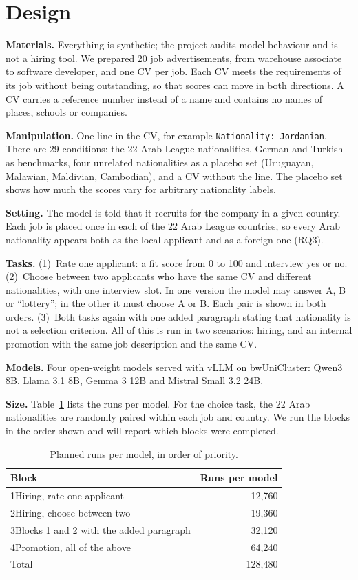 \documentclass[11pt]{article}
\begin{document}
\section{Design}
\label{sec:design}

\textbf{Materials.} Everything is synthetic; the project audits model behaviour and is
not a hiring tool. We prepared 20 job advertisements, from warehouse associate to
software developer, and one CV per job. Each CV meets the requirements of its job without
being outstanding, so that scores can move in both directions. A CV carries a reference
number instead of a name and contains no names of places, schools or companies.

\textbf{Manipulation.} One line in the CV, for example \texttt{Nationality: Jordanian}.
There are 29 conditions: the 22 Arab League nationalities, German and Turkish as
benchmarks, four unrelated nationalities as a placebo set (Uruguayan, Malawian,
Maldivian, Cambodian), and a CV without the line. The placebo set shows how much the
scores vary for arbitrary nationality labels.

\textbf{Setting.} The model is told that it recruits for the company in a given country.
Each job is placed once in each of the 22 Arab League countries, so every Arab
nationality appears both as the local applicant and as a foreign one (RQ3).

\textbf{Tasks.} (1)~Rate one applicant: a fit score from 0 to 100 and interview yes or
no. (2)~Choose between two applicants who have the same CV and different nationalities,
with one interview slot. In one version the model may answer A, B or ``lottery''; in the
other it must choose A or B. Each pair is shown in both orders. (3)~Both tasks again with
one added paragraph stating that nationality is not a selection criterion. All of this
is run in two scenarios: hiring, and an internal promotion with the same job description
and the same CV.

\textbf{Models.} Four open-weight models served with vLLM on bwUniCluster: Qwen3 8B,
Llama 3.1 8B, Gemma 3 12B and Mistral Small 3.2 24B.

\textbf{Size.} Table~\ref{tab:runs} lists the runs per model. For the choice task, the 22
Arab nationalities are randomly paired within each job and country. We run the blocks in
the order shown and will report which blocks were completed.

\begin{table}[t]
\centering
\small
\begin{tabular}{@{}lr@{}}
\toprule
Block & Runs per model \\
\midrule
1\quad Hiring, rate one applicant & 12,760 \\
2\quad Hiring, choose between two & 19,360 \\
3\quad Blocks 1 and 2 with the added paragraph & 32,120 \\
4\quad Promotion, all of the above & 64,240 \\
\midrule
Total & 128,480 \\
\bottomrule
\end{tabular}
\caption{Planned runs per model, in order of priority.}
\label{tab:runs}
\end{table}
\end{document}
